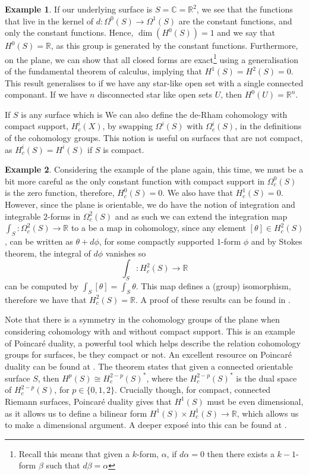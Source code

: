 \documentclass[11pt]{report}
\theoremstyle{definition}
\newtheorem*{example*}{Example}
\begin{document}
\begin{example*}
  If our underlying surface is $S=\mathbb{C}=\mathbb{R}^2$, we see that the functions that live in the kernel of $d:\Omega^0(S)\rightarrow\Omega^1(S)$ are the constant functions, and only the constant functions. Hence, $\dim(H^0(S)) = 1$ and we say that $H^0(S)=\mathbb{R}$, as this group is generated by the constant functions. Furthermore, on the plane, we can show that all closed forms are exact\footnote{Recall this means that given a $k$-form, $\alpha$, if $d\alpha = 0$ then there exists a $k-1$-form $\beta$ such that $d\beta = \alpha$} using a generalisation of the fundamental theorem of calculus, implying that $H^1(S)=H^2(S) = 0$. This result generalises to if we have any star-like open set with a single connected componant. If we have $n$ disconnected star like open sets $U$, then $H^0(U)=\mathbb{R}^n$.
\end{example*}
If $S$ is any surface which is 
We can also define the de-Rham cohomology with compact support, $H^i_c(X)$, by swapping $\Omega^i(S)$ with $\Omega_c^i(S)$, in the definitions of the cohomology groups. This notion is useful on surfaces that are not compact, as $H^i_c(S) = H^i(S)$ if $S$ is compact.
\begin{example*}
  Considering the example of the plane again, this time, we must be a bit more careful as the only constant function with compact support in $\Omega^0_c(S)$ is the zero function, therefore, $H^0_c(S)=0$. We also have that $H^1_c(S)=0$. However, since the plane is orientable, we do have the notion of integration and integrable $2$-forms in $\Omega^2_c(S)$ and as such we can extend the integration map $\int_S : \Omega^2_c(S) \rightarrow \mathbb{R}$ to a be a map in cohomology, since any element $[\theta] \in H^2_c(S)$, can be written as $\theta + d\phi$, for some compactly supported $1$-form $\phi$ and by Stokes theorem, the integral of $d\phi$ vanishes so
  \[\int_S:H^2_c(S)\rightarrow \mathbb{R}\]
  can be computed by $\int_S [\theta] = \int_S \theta$. This map defines a (group) isomorphism, therefore we have that $H^2_c(S)=\mathbb{R}$. A proof of these results can be found in \cite[(p.91, Theorem 10.13)]{calcohomo}.
\end{example*}
Note that there is a symmetry in the cohomology groups of the plane when considering cohomology with and without compact support. This is an example of Poincar\'{e} duality, a powerful tool which helps describe the relation cohomology groups for surfaces, be they compact or not. An excellent resource on Poincar\'{e} duality can be found at \cite[Chapter 13]{calcohomo}. The theorem states that given a connected orientable surface $S$, then $H^p(S) \cong H^{2-p}_c(S)^*$, where the $H^{2-p}_c(S)^*$ is the dual space of $H^{2-p}_c(S)$, for $p \in \{0,1,2\}$.
Crucially though, for compact, connected Riemann surfaces, Poincar\'{e} duality gives that $H^1(S)$ must be even dimensional, as it allows us to define a bilinear form $H^1(S)\times H^1_c(S) \rightarrow \mathbb{R}$, which allows us to make a dimensional argument. A deeper expos\'{e} into this can be found at \cite[p.130]{calcohomo}.
\end{document}
